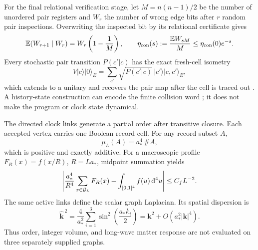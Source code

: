 For the final relational verification stage, let \(M=n(n-1)/2\) be the
number of unordered pair registers and \(W_r\) the number of wrong edge
bits after \(r\) random pair inspections.  Overwriting the inspected bit by
its relational certificate gives
\begin{equation}
 {\mathbb E}(W_{r+1}\mid W_r)
 =W_r\left(1-\frac1M\right),
 \qquad
 \eta_{\rm con}(s)
 :=\frac{{\mathbb E}W_{sM}}{M}\leq
 \eta_{\rm con}(0)e^{-s}.
 \label{eq:same-link-constructor-error}
\end{equation}
Every stochastic pair transition \(P(c'|c)\) has the exact fresh-cell
isometry
\begin{equation}
 V|c\rangle|0\rangle_E
 =\sum_{c'}\sqrt{P(c'|c)}\,|c'\rangle|c,c'\rangle_E ,
 \label{eq:same-link-stinespring}
\end{equation}
which extends to a unitary and recovers the pair map after the cell is
traced out \cite{Stinespring1955}.  A history-state construction can encode
the finite collision word \cite{Feynman1985,PageWootters1983}; it does not
make the program or clock state dynamical.

The directed clock links generate a partial order after transitive closure.
Each accepted vertex carries one Boolean record cell.  For any record subset
\(A\),
\begin{equation}
 \mu_L(A)=a_*^4\,\# A ,
 \label{eq:same-link-volume}
\end{equation}
which is positive and exactly additive.  For a macroscopic profile
\(F_R(x)=f(x/R)\), \(R=La_*\), midpoint summation yields
\begin{equation}
 \left|
 \frac{a_*^4}{R^4}\sum_{x\in{\cal G}_L}F_R(x)
 -\int_{[0,1]^4}f(u)\,\mathrm d^4u
 \right|
 \leq C_fL^{-2}.
 \label{eq:same-link-volume-rate}
\end{equation}
The same active links define the scalar graph Laplacian.  Its spatial
dispersion is
\begin{equation}
 \widehat{\bm k}^{\,2}
 =\frac4{a_*^2}\sum_{i=1}^{3}
 \sin^2\!\left(\frac{a_*k_i}{2}\right)
 =\bm k^2+O(a_*^2|\bm k|^4).
 \label{eq:same-link-dispersion}
\end{equation}
Thus order, integer volume, and long-wave matter response are not evaluated
on three separately supplied graphs.

